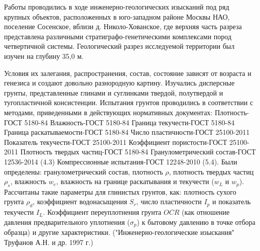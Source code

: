 Работы проводились в ходе инженерно-геологических изысканий под ряд крупных объектов, расположенных в юго-западном районе Москвы НАО, поселение Сосенское, вблизи д. Николо-Хованское, где верхняя часть разреза представлена различными стратиграфо-генетическими комплексами пород четвертичной системы. Геологический разрез исследуемой территории был изучен на глубину 35,0 м.

Условия их залегания, распространения, состав, состояние зависят от возраста и генезиса и создают довольно разнородную картину. Изучались дисперсные грунты, представленные глинами и суглинками твердой, полутвердой и тугопластичной консистенции. Испытания грунтов проводились в соответствии с методами, приведенными в действующих нормативных документах: Плотность-ГОСТ 5180-84
Влажность-ГОСТ 5180-84
Граница текучести-ГОСТ 5180-84
Граница раскатываемости-ГОСТ 5180-84
Число пластичности-ГОСТ 25100-2011
Показатель текучести-ГОСТ 25100-2011
Коэффициент пористости-ГОСТ 25100-2011
Плотность твердых частиц-ГОСТ 5180-84
Гранулометрический состав-ГОСТ 12536-2014 (4.3)
Компрессионные испытания-ГОСТ 12248-2010 (5.4).
 Были определены: гранулометрический состав, плотность $\rho$, плотность твердых частиц $\rho_s$, влажность $w_e$, влажность на границе раскатывания и текучести ($w_L$ и $w_p$). Рассчитаны такие параметры для глинистых грунтов, как: плотность сухого грунта $\rho_d$,  коэффициент водонасыщения $S_r$, число пластичности $I_p$ и показатель текучести $I_L$. Коэффициент переуплотнения грунта $OCR$ (как отношение давления предварительного уплотнения ($\sigma_p$) к бытовому давлению в точке отбора образца) и другие характеристики. ("Инженерно-геологические изыскания" Труфанов А.Н. и др. 1997 г.)